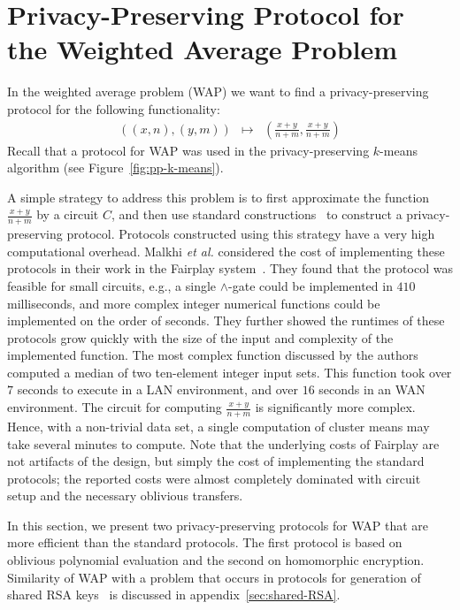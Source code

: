 \section{Privacy-Preserving Protocol for \\ the Weighted Average Problem}
\label{sec:WAP}

In the weighted average problem (WAP) we want to find
a privacy-preserving protocol for the following functionality:
\begin{eqnarray*}
((x,n),(y,m)) & \longmapsto & (\frac{x+y}{n+m}, \frac{x+y}{n+m})
\end{eqnarray*}
Recall that a protocol for WAP was used in
the privacy-preserving $k$-means algorithm (see Figure~\ref{fig:pp-k-means}).


A simple strategy to address this problem is to first approximate the
function $\frac{x+y}{n+m}$ by a circuit $C$, and then use standard
constructions~\cite{GMW87,Goldreich:JACM:91,Yao86} to construct
a privacy-preserving protocol.  Protocols constructed using this
strategy have a very high computational overhead. Malkhi {\it et al.} 
considered the cost of implementing these protocols in their work in
the Fairplay system~\cite{mnps04}.  They found that the protocol was
feasible for small circuits, e.g., a single $\wedge$-gate could be
implemented in $410$ milliseconds, and more complex integer numerical
functions could be implemented on the order of seconds.  They further
showed the runtimes of these protocols grow quickly with the size of
the input and complexity of the implemented function.  The most
complex function discussed by the authors computed a median of two
ten-element integer input sets.  This function took over $7$ seconds
to execute in a LAN environment, and over $16$ seconds in an WAN
environment.  The circuit for computing $\frac{x+y}{n+m}$ is
significantly more complex. Hence, with a non-trivial data set, a
single computation of cluster means may take several minutes to compute.  Note that
the underlying costs of Fairplay are not artifacts of the design, but
simply the cost of implementing the standard protocols; the reported
costs were almost completely dominated with circuit setup and the
necessary oblivious transfers.

In this section, we present two privacy-preserving protocols for WAP
that are more efficient than the standard protocols. The first
protocol is based on oblivious polynomial evaluation and the second on
homomorphic encryption. Similarity of WAP with a problem that occurs
in protocols for generation of shared RSA
keys~\cite{Boneh-Franklin-2001,Gilboa99} is discussed in
appendix~\ref{sec:shared-RSA}.


